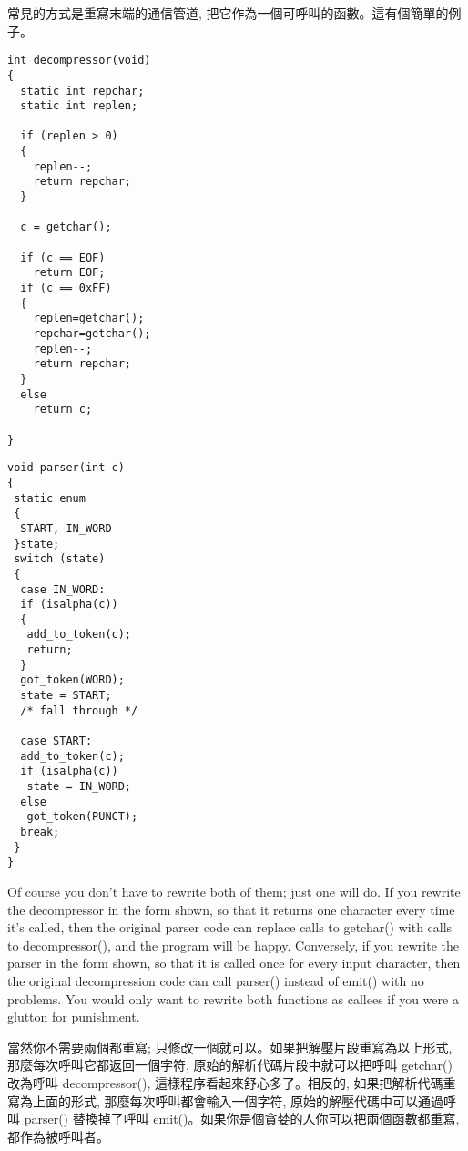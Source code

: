 \documentclass[12pt]{article}
\begin{document}
\begin{CJK}{UTF8}{bsmi}
常見的方式是重寫末端的通信管道, 把它作為一個可呼叫的函數。這有個簡單的例子。 

\newpage
\begin{multicols}{2}

\begin{lstlisting}[caption=decompression, basicstyle=\footnotesize]
int decompressor(void) 
{
  static int repchar;
  static int replen;

  if (replen > 0) 
  {
    replen--;
    return repchar;
  }

  c = getchar();

  if (c == EOF)
    return EOF;
  if (c == 0xFF) 
  {
    replen=getchar();
    repchar=getchar();
    replen--;
    return repchar;
  }
  else
    return c;

}
\end{lstlisting}

\begin{lstlisting}[caption=parsesr, basicstyle=\footnotesize, breaklines=true]
void parser(int c) 
{
 static enum 
 {
  START, IN_WORD
 }state;
 switch (state) 
 {
  case IN_WORD:
  if (isalpha(c)) 
  {
   add_to_token(c);
   return;
  }
  got_token(WORD);
  state = START;
  /* fall through */

  case START:
  add_to_token(c);
  if (isalpha(c))
   state = IN_WORD;
  else
   got_token(PUNCT);
  break;
 }
}
\end{lstlisting}
\end{multicols}

 Of course you don't have to rewrite both of them; just one will do. If you rewrite the decompressor in the form shown, so that it returns one character every time it's called, then the original parser code can replace calls to getchar() with calls to decompressor(), and the program will be happy. Conversely, if you rewrite the parser in the form shown, so that it is called once for every input character, then the original decompression code can call parser() instead of emit() with no problems. You would only want to rewrite both functions as callees if you were a glutton for punishment.

當然你不需要兩個都重寫; 只修改一個就可以。如果把解壓片段重寫為以上形式, 那麼每次呼叫它都返回一個字符, 原始的解析代碼片段中就可以把呼叫 getchar() 改為呼叫 decompressor(), 這樣程序看起來舒心多了。相反的, 如果把解析代碼重寫為上面的形式, 那麼每次呼叫都會輸入一個字符, 原始的解壓代碼中可以通過呼叫 parser() 替換掉了呼叫 emit()。如果你是個貪婪的人你可以把兩個函數都重寫, 都作為被呼叫者。


\end{CJK}
\end{document}

